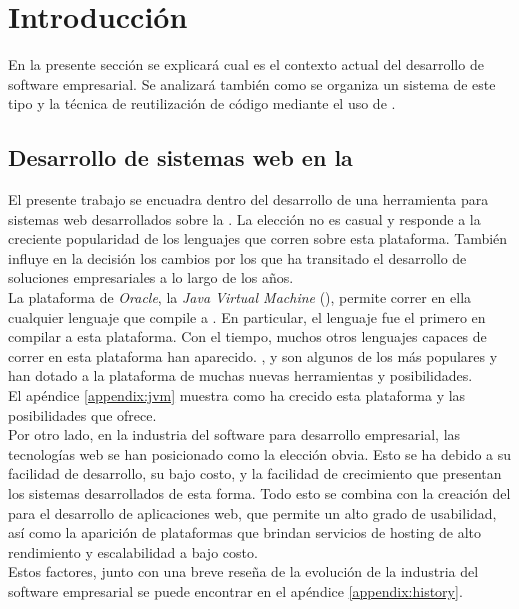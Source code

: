 \section{Introducción}
\label{sec:intro}

En la presente sección se explicará cual es el contexto actual del desarrollo de software empresarial. Se analizará también como se organiza un sistema de este tipo y la técnica de reutilización de código mediante el uso de \dependencies.\\


\subsection{Desarrollo de sistemas web en la \jvm}
\label{subsec:intro:jvm_dev}

El presente trabajo se encuadra dentro del desarrollo de una herramienta para 
sistemas web desarrollados sobre la \jvm. La elección no es casual y responde 
a la creciente popularidad de los lenguajes que corren sobre esta plataforma. 
También influye en la decisión los cambios por los que ha transitado el
desarrollo de soluciones empresariales a lo largo de los años.\\
La plataforma de \emph{Oracle}, la \emph{Java Virtual Machine} (\jvm), permite 
correr  en ella cualquier lenguaje que compile a \bytecode \java. En 
particular, el lenguaje \java fue el primero en compilar a esta plataforma. Con 
el tiempo, muchos otros lenguajes capaces de correr en esta plataforma han 
aparecido. \scala, \clojure y \groovy  son algunos de los más populares y han 
dotado a la  plataforma de muchas nuevas herramientas y posibilidades.\\
El apéndice \ref{appendix:jvm} muestra como ha crecido esta plataforma y las 
posibilidades que ofrece.\\
Por otro lado, en la industria del software para desarrollo empresarial, las 
tecnologías web se han posicionado como la elección obvia. Esto se ha debido a 
su facilidad de desarrollo, su bajo costo, y la facilidad de crecimiento que 
presentan los sistemas desarrollados de esta forma. Todo esto se combina con 
la creación del  para el desarrollo de aplicaciones web, que permite un 
alto grado de usabilidad, así como la aparición de plataformas que brindan 
servicios de hosting de alto rendimiento y escalabilidad a bajo costo.\\
Estos factores, junto con una breve reseña de la evolución de la industria del 
software empresarial se puede encontrar en el apéndice \ref{appendix:history}.


